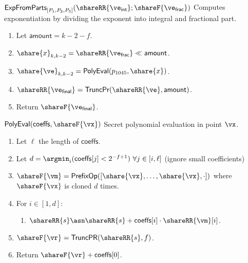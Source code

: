 \msubsubsection
  {$\mathsf{ExpFromParts}_{[P_1, P_2, P_3]}(\shareRR{\ve_{\mathsf{int}}}; \shareF{\ve_{\mathsf{frac}}})$}
  Computes exponentiation by dividing the exponent into integral and fractional part.
\begin{enumerate}
	\item Let $\mathsf{amount} = k - 2 - f$.
	\item $\share{x}_{k, k - 2} = \shareRR{\ve_{\mathsf{frac}}} \ll \mathsf{amount}$.
	\item $\share{\ve}_{k, k-2} = \mathsf{PolyEval}(p_{1045}, \share{x})$.
	\item $\shareRR{\ve_{\mathsf{final}}} = \mathsf{TruncPr}(\shareRR{\ve}, \mathsf{amount})$.
	\item Return $\shareF{\ve_{\mathsf{final}}}$.
\end{enumerate}

\msubsubsection
{$\mathsf{PolyEval}(\mathsf{coeffs}, \shareF{\vx})$}
Secret polynomial evaluation in point $\vx$.
\begin{enumerate}
	\item Let $\ell$ the length of $\mathsf{coeffs}$.
	\item Let $d = \argmin_i (\mathsf{coeffs}[j] < 2^{-f+1}) \text{ } \forall j \in [i, \ell]$ (ignore small coefficients)
	\item $\shareF{\vm} = \mathsf{PrefixOp}([\share{\vx}, \dots, \share{\vx}, \cdot])$ where $\shareF{\vx}$ is cloned $d$ times.
	\item For $i \in [1, d]$:
	\begin{enumerate}
		\item $\shareRR{s} \asn \shareRR{s} + \mathsf{coeffs}[i] \cdot \shareRR{\vm}[i]$.
	\end{enumerate}
	\item $\shareF{\vr} = \mathsf{TruncPR}(\shareRR{s}, f)$.
	\item Return $\shareF{\vr} + \mathsf{coeffs}[0]$.
\end{enumerate}





